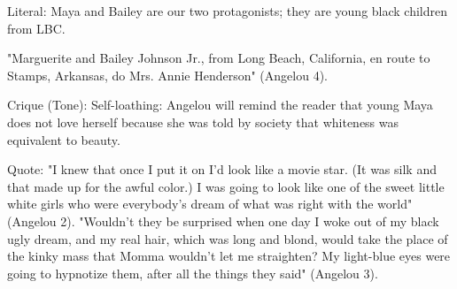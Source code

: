 
Literal:
Maya and Bailey are our two protagonists; they are young black children from LBC.

"Marguerite and Bailey Johnson Jr., from Long Beach, California, en route to Stamps, Arkansas, do Mrs. Annie Henderson" (Angelou 4).

Crique (Tone): Self-loathing: Angelou will remind the reader that young Maya does not love herself because she was told by society that whiteness was equivalent to beauty.

Quote:
"I knew that once I put it on I'd look like a movie star. (It was silk and that made up for the awful color.) I was going to look like one of the sweet little white girls who were everybody's dream of what was right with the world" (Angelou 2).
"Wouldn't they be surprised when one day I woke out of my black ugly dream, and my real hair, which was long and blond, would take the place of the kinky mass that Momma wouldn't let me straighten? My light-blue eyes were going to hypnotize them, after all the things they said" (Angelou 3).

